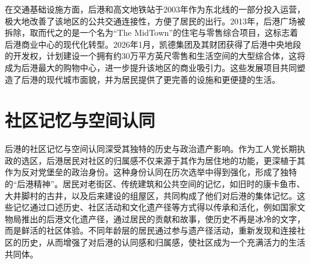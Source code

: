 \documentclass[11pt,a4paper,twoside,openany]{book}
\begin{document}
在交通基础设施方面，后港和高文地铁站于2003年作为东北线的一部分投入运营，极大地改善了该地区的公共交通连接性，方便了居民的出行。2013年，后港广场被拆除，取而代之的是一个名为“The MidTown”的住宅与零售综合项目，这标志着后港商业中心的现代化转型。2026年1月，凯德集团及其财团获得了后港中央地段的开发权，计划建设一个拥有约30万平方英尺零售和生活空间的大型综合体，这将成为后港最大的购物中心，进一步提升该地区的商业吸引力。这些发展项目共同塑造了后港的现代城市面貌，并为居民提供了更完善的设施和更便捷的生活。

\section{社区记忆与空间认同}
后港的社区记忆与空间认同深受其独特的历史与政治遗产影响。作为工人党长期执政的选区，后港居民对社区的归属感不仅来源于其作为居住地的功能，更深植于其作为反对党堡垒的政治身份。这种身份认同在历次选举中得到强化，形成了独特的“后港精神”。居民对老街区、传统建筑和公共空间的记忆，如旧时的康卡鱼市、大井脚村的古井，以及后来建设的组屋区，共同构成了他们对后港的集体记忆。这些记忆通过口述历史、社区活动和文化遗产径等方式得以传承和活化，例如国家文物局推出的后港文化遗产径，通过居民的贡献和故事，使历史不再是冰冷的文字，而是鲜活的社区体验。不同年龄层的居民通过参与遗产径活动，重新发现和连接社区的历史，从而增强了对后港的认同感和归属感，使社区成为一个充满活力的生活共同体。
\end{document}
